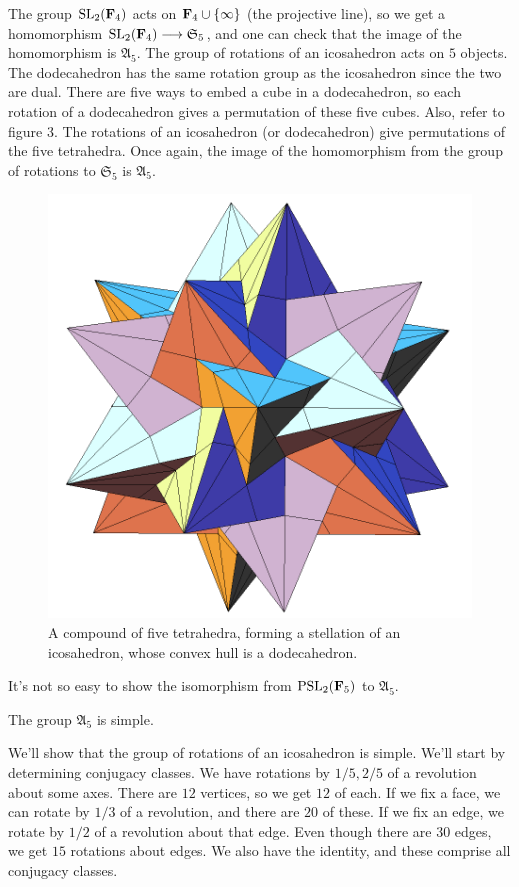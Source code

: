 \documentclass[11pt, twoside]{amsart}
\begin{document}
The group $\operatorname{SL}_2(\mathbf F_4)$ acts on $\mathbf F_4 \cup \{ \infty\}$ (the projective line), so we get a homomorphism $\operatorname{SL}_2(\mathbf F_4)\longrightarrow \mathfrak{S}_5$, and one can check that the image of the homomorphism is $\mathfrak{A}_5$. The group of rotations of an icosahedron acts on $5$ objects. The dodecahedron has the same rotation group as the icosahedron since the two are dual. There are five ways to embed a cube in a dodecahedron, so each rotation of a dodecahedron gives a permutation of these five cubes. Also, refer to figure 3. The rotations of an icosahedron (or dodecahedron) give permutations of the five tetrahedra. Once again, the image of the homomorphism from the group of rotations to $\mathfrak{S}_5$ is $\mathfrak{A}_5$.
\begin{figure}
\centering
\includegraphics[scale=0.7]{images/icosahedron_tetrahedral_stellation}
\caption{A compound of five tetrahedra, forming a stellation of an icosahedron, whose convex hull is a dodecahedron.}
\end{figure}
It's not so easy to show the isomorphism from $\operatorname{PSL}_2(\mathbf F_5) $ to $\mathfrak{A}_5$.

\begin{proposition}
The group $\mathfrak{A}_5$ is simple.
\end{proposition}

We'll show that the group of rotations of an icosahedron is simple. We'll start by determining conjugacy classes. We have rotations by $1/5, 2/5$ of a revolution about some axes. There are $12$ vertices, so we get $12$ of each. If we fix a face, we can rotate by $1/3$ of a revolution, and there are $20$ of these. If we fix an edge, we rotate by $1/2$ of a revolution about that edge. Even though there are $30$ edges, we get $15$ rotations about edges. We also have the identity, and these comprise all conjugacy classes.
\end{document}
